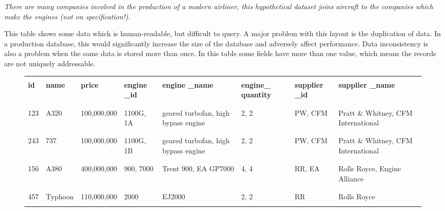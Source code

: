 \documentclass[9pt]{article}
\begin{document}
\emph{There are many companies involved in the production of a modern airliner, this hypothetical dataset joins aircraft to the companies which make the engines (not on specification!).}

This table shows some data which is human-readable, but difficult to query. A major problem with this layout is the duplication of data. In a production database, this would significantly increase the size of the database and adversely affect performance. Data inconsistency is also a problem when the same data is stored more than once. In this table some fields have more than one value, which means the records are not uniquely addressable.


\begin{figure}[H]
\begin{center}
\begin{longtable}{ |C{0.05\textwidth}|C{0.08\textwidth}|C{0.105\textwidth}|C{0.1\textwidth}|C{0.1\textwidth}|C{0.1\textwidth}|C{0.07\textwidth}|C{0.1\textwidth}| }

\hline
&&&&&&&\\
\textbf{id} & \textbf{name} & \textbf{price} & \textbf{engine \_id} & \textbf{engine \_name} & \textbf{engine\_ quantity} & \textbf{supplier \_id} & \textbf{supplier \_name}\\
&&&&&&&\\
\hline
&&&&&&&\\
123 & A320 & 100,000,000 & 1100G, 1A & geared turbofan, high bypass engine & 2, 2 & PW, CFM & Pratt \& Whitney, CFM International\\
&&&&&&&\\
\hline
&&&&&&&\\
243 & 737 & 100,000,000 & 1100G, 1B & geared turbofan, high bypass engine & 2, 2 & PW, CFM & Pratt \& Whitney, CFM International\\
&&&&&&&\\
\hline
&&&&&&&\\
156 & A380 & 400,000,000 & 900, 7000 & Trent 900, EA GP7000 & 4, 4 & RR, EA & Rolls Royce, Engine Alliance\\
&&&&&&&\\
\hline
&&&&&&&\\
457 & Typhoon & 110,000,000 & 2000 & EJ2000 & 2, 2 & RR & Rolls Royce\\
&&&&&&&\\
\hline
\end{longtable}
\end{center}
\end{figure}
\end{document}

